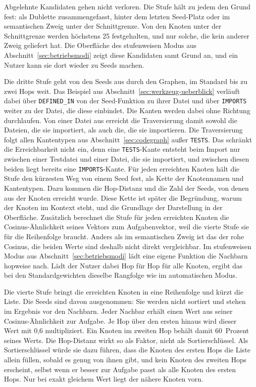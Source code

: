 Abgelehnte Kandidaten gehen nicht verloren. Die Stufe hält zu jedem den Grund fest: als Dublette zusammengefasst, hinter dem letzten Seed-Platz oder im semantischen Zweig unter der Schnittgrenze. Von den Knoten unter der Schnittgrenze werden höchstens 25 festgehalten, und nur solche, die kein anderer Zweig geliefert hat. Die Oberfläche des stufenweisen Modus aus Abschnitt~\ref{sec:betriebsmodi} zeigt diese Kandidaten samt Grund an, und ein Nutzer kann sie dort wieder zu Seeds machen.

Die dritte Stufe geht von den Seeds aus durch den Graphen, im Standard bis zu zwei Hops weit. Das Beispiel aus Abschnitt~\ref{sec:werkzeug-ueberblick} verläuft dabei über \texttt{DEFINED\_IN} von der Seed-Funktion zu ihrer Datei und über \texttt{IMPORTS} weiter zu der Datei, die diese einbindet. Die Kanten werden dabei ohne Richtung durchlaufen. Von einer Datei aus erreicht die Traversierung damit sowohl die Dateien, die sie importiert, als auch die, die sie importieren. Die Traversierung folgt allen Kantentypen aus Abschnitt~\ref{sec:codegraph} außer \texttt{TESTS}. Das schränkt die Erreichbarkeit nicht ein, denn eine \texttt{TESTS}-Kante entsteht beim Import nur zwischen einer Testdatei und einer Datei, die sie importiert, und zwischen diesen beiden liegt bereits eine \texttt{IMPORTS}-Kante. Für jeden erreichten Knoten hält die Stufe den kürzesten Weg von einem Seed fest, als Kette der Knotennamen und Kantentypen. Dazu kommen die Hop-Distanz und die Zahl der Seeds, von denen aus der Knoten erreicht wurde. Diese Kette ist später die Begründung, warum der Knoten im Kontext steht, und die Grundlage der Darstellung in der Oberfläche. Zusätzlich berechnet die Stufe für jeden erreichten Knoten die Cosinus-Ähnlichkeit seines Vektors zum Aufgabenvektor, weil die vierte Stufe sie für die Reihenfolge braucht. Anders als im semantischen Zweig ist das der rohe Cosinus, die beiden Werte sind deshalb nicht direkt vergleichbar. Im stufenweisen Modus aus Abschnitt~\ref{sec:betriebsmodi} lädt eine eigene Funktion die Nachbarn hopweise nach. Lädt der Nutzer dabei Hop für Hop für alle Knoten, ergibt das bei den Standardgewichten dieselbe Rangfolge wie im automatischen Modus.

Die vierte Stufe bringt die erreichten Knoten in eine Reihenfolge und kürzt die Liste. Die Seeds sind davon ausgenommen: Sie werden nicht sortiert und stehen im Ergebnis vor den Nachbarn. Jeder Nachbar erhält einen Wert aus seiner Cosinus-Ähnlichkeit zur Aufgabe. Je Hop über den ersten hinaus wird dieser Wert mit 0,6 multipliziert. Ein Knoten im zweiten Hop behält damit 60~Prozent seines Werts. Die Hop-Distanz wirkt so als Faktor, nicht als Sortierschlüssel. Als Sortierschlüssel würde sie dazu führen, dass die Knoten des ersten Hops die Liste allein füllen, sobald es genug von ihnen gibt, und kein Knoten des zweiten Hops erscheint, selbst wenn er besser zur Aufgabe passt als alle Knoten des ersten Hops. Nur bei exakt gleichem Wert liegt der nähere Knoten vorn.

